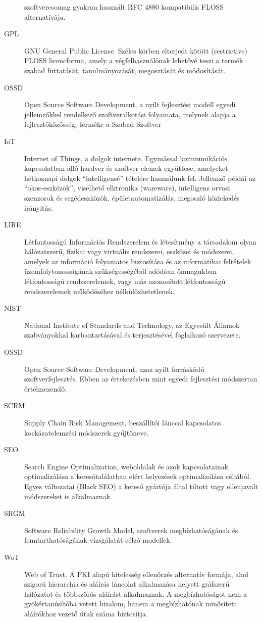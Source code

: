 \documentclass[12pt,magyar,a4paper,oneside]{scrreprt}
\begin{document}
\begin{description}
szoftvercsomag gyakran használt RFC 4880 kompatibilis FLOSS
alternatívája.
\item[GPL]
GNU General Public License. Széles körben elterjedt kötött (restrictive)
FLOSS licencforma, amely a végfelhasználónak lehetővé teszi a termék
szabad futtatását, tanulmányozását, megosztását és módosítását.
\item[OSSD]
Open Source Software Development, a nyílt fejlesztési modell egyedi
jellemzőkkel rendelkező szoftveralkotási folyamata, melynek alapja a
fejlesztőközösség, terméke a Szabad Szoftver
\item[IoT]
Internet of Things, a dolgok internete. Egymással kommunikációs
kapcsolatban álló hardver és szoftver elemek együttese, amelyeket
hétkoznapi dolgok ``intelligensé'' tételére használunk fel. Jellemző
példái az ``okos-eszközök'', viselhető elktronika (wareware),
intelligens orvosi szenzorok és segédeszközök, épületautomatizálás,
megoszló közlekedés irányítás.
\item[LIRE]
Létfontosságú Információs Rendszerelem és létesítmény a társadalom olyan
hálózatszerű, fizikai vagy virtuális rendszerei, eszközei és módszerei,
amelyek az információ folyamatos biztosítása és az informatikai
feltételek üzemfolytonosságának szükségességéből adódóan önmagukban
létfontosságú rendszerelemek, vagy más azonosított létfontosságú
rendszerelemek működéséhez nélkülözhetetlenek.
\item[NIST]
National Institute of Standards and Technology, az Egyesült Államok
szabványokkal karbantartásával és terjesztésével foglalkozó szervezete.
\item[OSSD]
Open Source Software Development, azaz nyílt forráskódú
szoftverfejlesztés. Ebben az értekezésben mint egyedi fejlesztési
módszertan értelmezendő.
\item[SCRM]
Supply Chain Risk Management, beszállítói lánccal kapcsolatos
kockázatelemzési módszerek gyűjtőneve.
\item[SEO]
Search Engine Optimalization, weboldalak és azok kapcsolatainak
optimalizálása a keresőtalálatban elért helyezések optimalizálása
céljából. Egyes változatai (Black SEO) a kereső gyártója által tiltott
vagy ellenjavalt módszereket is alkalmaznak.
\item[SRGM]
Software Reliability Growth Model, szoftverek megbízhatóságának és
fenntarthatóságának vizsgálatát célzó modellek.
\item[WoT]
Web of Trust. A PKI alapú hitelesség ellenőrzés alternatív formája, ahol
szigorú hierarchia és aláírás láncolat alkalmazása helyett gráfszerű
hálózatot és többszörös aláírást alkalmaznak. A megbízhatóságot nem a
gyökértanúsítóba vetett bizalom, hanem a megbízhatónak minősített
aláírókhoz vezető útak száma biztosítja.
\end{description}
\end{document}
